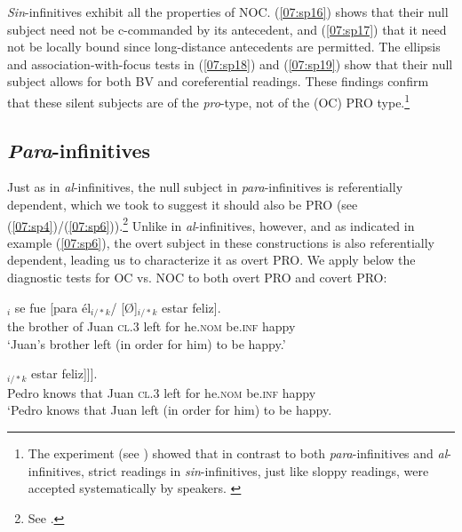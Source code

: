 \documentclass[output=paper,colorlinks,citecolor=brown,draft,draftmode]{langscibook}
\begin{document}
\textit{Sin}-infinitives exhibit all the properties of NOC. (\ref{07:sp16}) shows that their null subject need not be c-commanded by its antecedent, and (\ref{07:sp17}) that it need not be locally bound since long-distance antecedents are permitted. The ellipsis and association-with-focus tests in (\ref{07:sp18}) and (\ref{07:sp19}) show that their null subject allows for both BV and coreferential readings. These findings confirm that these silent subjects are of the \textit{pro}-type, not of the (OC) PRO type.\footnote{The experiment \citep{gomezinprogress} (see ) showed that in contrast to both \textit{para}-infinitives and \textit{al}-infinitives, strict readings in \textit{sin}-infinitives, just like sloppy readings, were accepted systematically by speakers. \label{07:sinfn}}


\subsection{\textit{Para}-infinitives}
\label{07:para-infinitives}
Just as in \textit{al}-infinitives, the null subject in \textit{para}-infinitives is referentially dependent, which we took to suggest it should also be PRO (see (\ref{07:sp4})/(\ref{07:sp6})).\footnote{See .} Unlike in \textit{al}-infinitives, however, and as indicated in example (\ref{07:sp6}), the overt subject in these constructions is also referentially dependent, leading us to characterize it as overt PRO. We apply below the diagnostic tests for OC vs. NOC to both overt PRO and covert PRO:

\begin{exe}
\ex\label{07:sp20}
$_i$ se fue [para él$_{i/*k}$/ [Ø]$_{i/*k}$  estar feliz].\\
the brother of Juan \textsc{cl.3} left   for he.\textsc{nom} {} be.\textsc{inf}  happy \\
\glt ‘Juan’s brother left (in order for him) to be happy.’
\end{exe}

\begin{exe}
\ex\label{07:sp21}
\gll [Pedro$_k$ sabe [que Juan$_i$ se fue [para él$_{i/*k}$/ [Ø]$_{i/*k}$ estar feliz]]].\\
Pedro knows that Juan \textsc{cl.3} left for he.\textsc{nom} {} be.\textsc{inf}  happy\\
\glt ‘Pedro knows that Juan left (in order for him) to be happy.
\end{exe}
\end{document}
